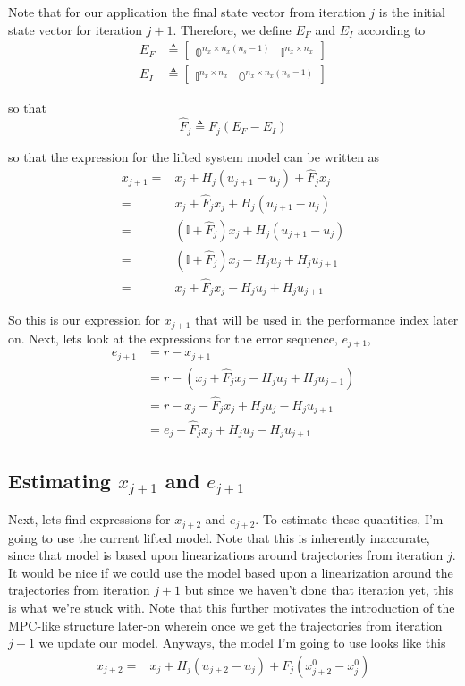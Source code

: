 \documentclass[landscape]{article}
\begin{document}
Note that for our application the final state vector from iteration $j$ is the initial state vector for iteration $j+1$.  Therefore, we define $E_F$ and $E_I$ according to
\begin{align}
E_F &\triangleq \begin{bmatrix} \mathbb{0}^{n_x \times n_x(n_s-1)} & \mathbb{I}^{n_x \times n_x} \end{bmatrix} \\
E_I &\triangleq \begin{bmatrix} \mathbb{I}^{n_x \times n_x}        & \mathbb{0}^{n_x \times n_x(n_s-1)}\end{bmatrix} 
\end{align}

so that 
\begin{equation}
\hat{F}_j \triangleq F_j \left(E_F-E_I\right)
\end{equation}

so that the expression for the lifted system model can be written as
\begin{align}
x_{j+1}  
= & x_j + H_j \left(u_{j+1} - u_j\right) + \hat{F}_j x_j \\
= & x_j + \hat{F}_j x_j + H_j \left(u_{j+1} - u_j\right) \\
= & ( \mathbb{I} + \hat{F}_j ) x_j + H_j \left(u_{j+1} - u_j\right) \\
= & ( \mathbb{I} + \hat{F}_j ) x_j - H_j u_j + H_j u_{j+1} \\
= & x_j + \hat{F}_j x_j - H_j u_j + H_j u_{j+1} 
\end{align}

So this is our expression for $x_{j+1}$ that will be used in the performance index later on.   Next, lets look at the expressions for the error sequence, $e_{j+1}$,
\begin{align}
e_{j+1} 
& = r - x_{j+1}\\
& = r - ( x_j + \hat{F}_j x_j - H_j u_j + H_j u_{j+1} ) \\
& = r -  x_j - \hat{F}_j x_j + H_j u_j - H_j u_{j+1} \\
& = e_j - \hat{F}_j x_j + H_j u_j - H_j u_{j+1} 
\end{align}

\subsection{Estimating $x_{j+1}$ and $e_{j+1}$}
Next, lets find expressions for $x_{j+2}$ and $e_{j+2}$.  To estimate these quantities, I'm going to use the current lifted model.  Note that this is inherently inaccurate, since that model is based upon linearizations around trajectories from iteration $j$.  It would be nice if we could use the model based upon a linearization around the trajectories from iteration $j+1$ but since we haven't done that iteration yet, this is what we're stuck with.  Note that this further motivates the introduction of the MPC-like structure later-on wherein once we get the trajectories from iteration $j+1$ we update our model.  Anyways, the model I'm going to use looks like this
\begin{align}
x_{j+2} = & x_j + H_j \left(u_{j+2} - u_{j}\right) + F_j\left( x^0_{j+2}-x^0_j\right)
\end{align}
\end{document}
